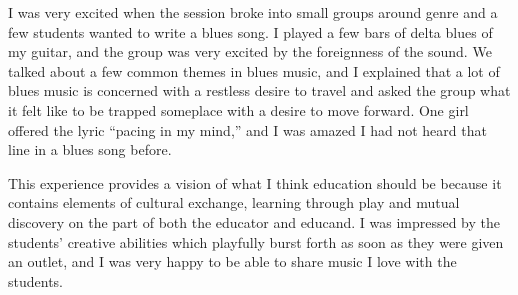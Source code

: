 \documentclass[oneside]{memoir}
\begin{document}
I was very excited when the session broke into small groups around
genre and a few students wanted to write a blues song.
I played a few bars of delta blues of my guitar, and the group was
very excited by the foreignness of the sound.
We talked about a few common themes in blues music, and I explained
that a lot of blues music is concerned with a restless desire to
travel and asked the group what it felt like to be trapped someplace
with a desire to move forward.
One girl offered the lyric ``pacing in my mind,'' and I was amazed I
had not heard that line in a blues song before.

This experience provides a vision of what I think education should be
because it contains elements of cultural exchange, learning through
play and mutual discovery on the part of both the educator and
educand.
I was impressed by the students' creative abilities which playfully
burst forth as soon as they were given an outlet, and I was very happy
to be able to share music I love with the students.
\end{document}

